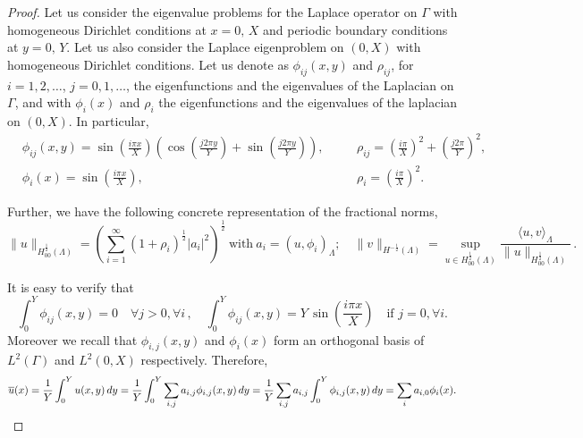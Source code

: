 \begin{proof}
Let us consider the eigenvalue problems for the Laplace operator on $\Gamma$ with homogeneous Dirichlet conditions at $x=0,\, X$ and periodic boundary conditions at $y=0,\, Y$. Let us also consider the Laplace eigenproblem on $(0,X)$ with homogeneous Dirichlet conditions. Let us denote as $\phi _{ij}(x,y)$ and $\rho _{ij}$, for $i=1,2,\dots$, $j=0,1,\dots$, the eigenfunctions and the eigenvalues of the Laplacian on $\Gamma$, and with $\phi _i(x)$ and $\rho _i$ the eigenfunctions and the eigenvalues of the laplacian on $(0,X)$. In particular,
\begin{align*}
&\phi _{ij}(x,y)=\sin \left(\frac{i\pi x}{X}\right)\left( \cos\left(\frac{j2\pi y}{Y}\right)+ \sin\left(\frac{j2\pi y}{Y}\right) \right),\quad
&&\rho_{ij}=\left(\frac{i\pi}{X}\right) ^2+\left(\frac{j2\pi}{Y}\right)^2,
\\
&\phi _{i}(x)=\sin \left(\frac{i\pi x}{X}\right),\quad
&&\rho _i = \left(\frac{i\pi}{X}\right) ^2.
\end{align*}

Further, we have
the following concrete representation of the fractional norms, 
\begin{equation}\label{eq:fracnorm_lambda}
\|u\|_{H^{\frac 12}_{00}(\Lambda)}=\left(\sum_{i=1}^{\infty} \left( 1+ \rho_{i}\right)^{\frac 12}|a_i|^2\right)^{\frac 12}
\ \text{with} \ a_i=\left(u, \phi _i \right)_{\Lambda};
\quad
\| v \|_{H^{-\frac 12}(\Lambda)} = \sup_{u\in H^{\frac 12}_{00}(\Lambda)}\frac{\langle u, v \rangle_\Lambda}{\|u\|_{H^{\frac 12}_{00}(\Lambda)}}\,.
\end{equation}

It is easy to verify that 
\begin{equation}\label{int_eigenf}
\int_0^{Y} \phi _{ij}(x,y)=0 \quad \forall j>0, \forall i\,,
\quad
\int_0^{Y} \phi _{ij}(x,y)= Y \, \sin\left(\frac{i\pi x}{X}\right) \quad \mbox{if } j=0, \forall i  .
\end{equation}
Moreover we recall that $\phi_{i,j}(x,y)$ and $\phi _i(x)$ form an orthogonal basis of $L^2(\Gamma)$ and $L^2(0,X)$ respectively. Therefore,
\begin{equation*}
\overline{u}(x)=\frac{1}{Y}\int_0^{Y} u(x,y)\, dy
= \frac{1}{Y}\int_0^{Y} \sum_{i,j} a_{i,j} \phi_{i,j}(x,y) \, dy
= \frac{1}{Y}\sum_{i,j} a_{i,j}\int_0^{Y}  \phi_{i,j}(x,y) \, dy
=  \sum_{i} a_{i,0} \phi_{i}(x).
\end{equation*}


\end{proof}
